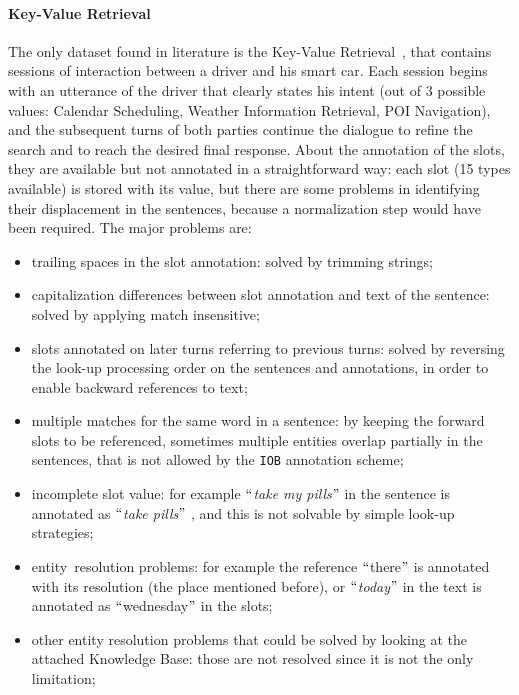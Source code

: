 \paragraph{Key-Value Retrieval}
The only dataset found in literature is the Key-Value Retrieval~\cite{eric2017key}, that contains sessions of interaction between a driver and his smart car. Each session begins with an utterance of the driver that clearly states his intent (out of 3 possible values: Calendar Scheduling, Weather Information Retrieval, POI Navigation), and the subsequent turns of both parties continue the dialogue to refine the search and to reach the desired final response. About the annotation of the slots, they are available but not annotated in a straightforward way: each slot (15 types available) is stored with its value, but there are some problems in identifying their displacement in the sentences, because a normalization step would have been required. The major problems are:

\begin{itemize}
	\item trailing spaces in the slot annotation: solved by trimming strings;

	\item capitalization differences between slot annotation and text of the sentence: solved by applying match insensitive;

	\item slots annotated on later turns referring to previous turns: solved by reversing the look-up processing order on the sentences and annotations, in order to enable backward references to text;

	\item multiple matches for the same word in a sentence: by keeping the forward slots to be referenced, sometimes multiple entities overlap partially in the sentences, that is not allowed by the \texttt{IOB} annotation scheme;

	\item incomplete slot value: for example $``$\textit{take my pills}$"$  in the sentence is annotated as $``$\textit{take pills}$"$ , and this is not solvable by simple look-up strategies;

	\item entity\ resolution problems:  for example the reference $``$there$"$  is annotated with its resolution (the place mentioned before), or $``$\textit{today}$"$  in the text is annotated as $``$wednesday$"$  in the slots;

	\item other entity resolution problems that could be solved by looking at the attached Knowledge Base: those are not resolved since it is not the only limitation;
\end{itemize}

